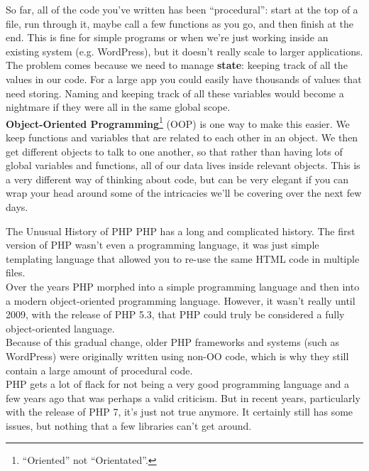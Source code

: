 So far, all of the code you've written has been ``procedural'': start at the top of a file, run through it, maybe call a few functions as you go, and then finish at the end. This is fine for simple programs or when we're just working inside an existing system (e.g. WordPress), but it doesn't really scale to larger applications.
\\

The problem comes because we need to manage \textbf{state}: keeping track of all the values in our code. For a large app you could easily have thousands of values that need storing. Naming and keeping track of all these variables would become a nightmare if they were all in the same global scope.
\\

\textbf{Object-Oriented Programming}\footnote{``Oriented'' not ``Orientated''.} (OOP) is one way to make this easier. We keep functions and variables that are related to each other in an object. We then get different objects to talk to one another, so that rather than having lots of global variables and functions, all of our data lives inside relevant objects. This is a very different way of thinking about code, but can be very elegant if you can wrap your head around some of the intricacies we'll be covering over the next few days.

\pagebreak

\begin{infobox}{The Unusual History of PHP}
    PHP has a long and complicated history. The first version of PHP wasn't even a programming language, it was just simple templating language that allowed you to re-use the same HTML code in multiple files.
    \\

    Over the years PHP morphed into a simple programming language and then into a modern object-oriented programming language. However, it wasn't really until 2009, with the release of PHP 5.3, that PHP could truly be considered a fully object-oriented language.
    \\

    Because of this gradual change, older PHP frameworks and systems (such as WordPress) were originally written using non-OO code, which is why they still contain a large amount of procedural code.
    \\

    PHP gets a lot of flack for not being a very good programming language and a few years ago that was perhaps a valid criticism. But in recent years, particularly with the release of PHP 7, it's just not true anymore. It certainly still has some issues, but nothing that a few libraries can't get around.

\end{infobox}


